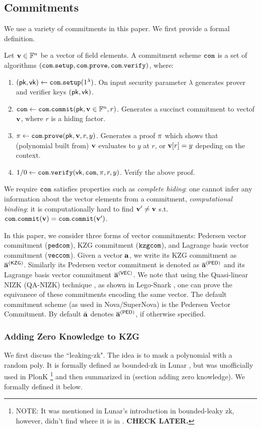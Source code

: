 \subsection{Commitments}
We use a variety of commitments in this paper. We first provide
a formal definition.
\begin{definition} Let ${{\mathbf {v}}} \in \mathbb{F}^n$ be a vector of field elements.
A commitment scheme $\mathtt{com}$ is a set of algorithms
$(\mathtt{com.setup}, \mathtt{com.prove}, \mathtt{com.verify})$, where:
\begin{enumerate}
 \item $(\mathsf{pk},\mathsf{vk}) \leftarrow \mathtt{com.setup}(1^\lambda)$. On input security parameter
 $\lambda$ generates prover and verifier keys $(\mathsf{pk}, \mathsf{vk})$.
 \item $\mathtt{com} \leftarrow \mathtt{com.commit}(\mathsf{pk}, {{\mathbf {v}}} \in \mathbb{F}^n, r)$. Generates
 a succinct commitment to vectof ${{\mathbf {v}}}$, where $r$ is a hiding factor.
 \item $\pi \leftarrow \mathtt{com.prove}(\mathsf{pk}, {{\mathbf {v}}}, r, y)$. Generates
 a proof $\pi$ which shows that (polynomial built from) ${{\mathbf {v}}}$ 
 evaluates to $y$ at $r$, or ${{\mathbf {v}}}[r] = y$ depeding on the context. 
 \item $1/0 \leftarrow \mathtt{com.verify}(\mathsf{vk}, \mathtt{com}, \pi, r, y)$. Verify
 the above proof.
\end{enumerate}
\end{definition}
We require $\mathtt{com}$ satisfies properties such as {\em complete hiding}: 
one cannot infer any information about the vector elements from a commitment,
{\em computational binding}: it is computationally hard to find 
${{\mathbf {v}}}' \neq {{\mathbf {v}}}$ s.t. 
$\mathtt{com.commit}({{\mathbf {v}}}) = \mathtt{com.commit}({{\mathbf {v}}}')$.

In this paper, we consider three forms of vector commitments:
Pedersen vector commitment ($\mathtt{pedcom}$), KZG commitment
($\mathtt{kzgcom}$), and Lagrange basis vector commitment ($\mathtt{veccom}$). 
Given a vector ${{\mathbf {a}}}$, we write its KZG commitment as
$\overline{{{\mathbf {a}}}}^{(\mathsf{KZG})}$. Similarly its Pedersen vector commitment
is denoted as $\overline{{{\mathbf {a}}}}^{(\mathsf{PED})}$ and its
Lagrange basis vector commitment $\overline{{{\mathbf {a}}}}^{(\mathsf{VEC})}$.
We note that using the Quasi-linear 
NIZK (QA-NIZK) technique \cite{Gonzalez15}, as shown in
Lego-Snark \cite{LegoSnark}, one can prove the equivanece
of these commitments encoding the same vector.
The default commitment scheme (as used in Nova/SuperNova)
is the Pedersen Vector Commitment. By default $\bar{{{\mathbf {a}}}}$
denotes $\overline{{{\mathbf {a}}}}^{(\mathsf{PED})}$, if otherwise specified.

\subsubsection{Adding Zero Knowledge to KZG}
We first discuss the ``leaking-zk".
The idea is to mask a polynomial with a random poly.
It is formally defined as bounded-zk in Lunar \cite{Lunar},
but was unofficially used in PlonK \cite{GWC19}\footnote{ 
NOTE: It was mentioned in Lunar's
introduction in bounded-leaky zk, 
however, didn't find where it is in \cite{GWC19}. {\bf CHECK LATER.}}
and then summarized in \cite{CCG23} (section adding zero
knowledge). We formally defined it below.

